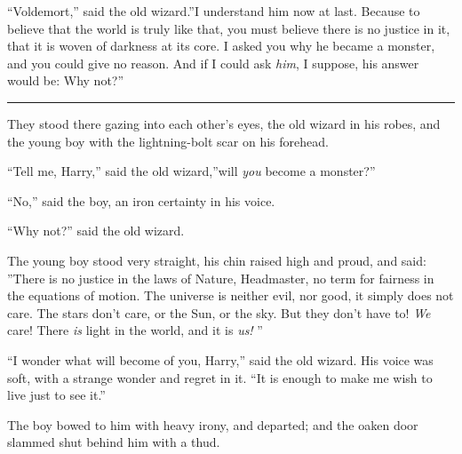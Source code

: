 ``Voldemort,'' said the old wizard.''I understand him now at last.
Because to believe that the world is truly like that, you must believe
there is no justice in it, that it is woven of darkness at its core. I
asked you why he became a monster, and you could give no reason. And if
I could ask \emph{him}, I suppose, his answer would be: Why not?''

\begin{center}\rule{3in}{0.4pt}\end{center}

They stood there gazing into each other's eyes, the old wizard in his
robes, and the young boy with the lightning-bolt scar on his forehead.

``Tell me, Harry,'' said the old wizard,''will \emph{you} become a
monster?''

``No,'' said the boy, an iron certainty in his voice.

``Why not?'' said the old wizard.

The young boy stood very straight, his chin raised high and proud, and
said: ''There is no justice in the laws of Nature, Headmaster, no term
for fairness in the equations of motion. The universe is neither evil,
nor good, it simply does not care. The stars don't care, or the Sun, or
the sky. But they don't have to! \emph{We} care! There \emph{is} light
in the world, and it is \emph{us!} ''

``I wonder what will become of you, Harry,'' said the old wizard. His
voice was soft, with a strange wonder and regret in it. ``It is enough
to make me wish to live just to see it.''

The boy bowed to him with heavy irony, and departed; and the oaken door
slammed shut behind him with a thud.

